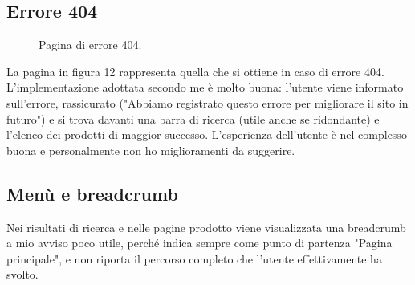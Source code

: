 \subsection{Errore 404}
\begin{figure}[!htb]
	\caption{\label{fig:figura12}} Pagina di errore 404.
\end{figure}
La pagina in figura 12 rappresenta quella che si ottiene in caso di errore 404. L'implementazione adottata secondo me è molto buona: l'utente viene informato sull'errore, rassicurato ("Abbiamo registrato questo errore per migliorare il sito in futuro") e si trova davanti una barra di ricerca (utile anche se ridondante) e l'elenco dei prodotti di maggior successo. L'esperienza dell'utente è nel complesso buona e personalmente non ho miglioramenti da suggerire.

\subsection{Menù e breadcrumb}
Nei risultati di ricerca e nelle pagine prodotto viene visualizzata una breadcrumb a mio avviso poco utile, perché indica sempre come punto di partenza "Pagina principale", e non riporta il percorso completo che l'utente effettivamente ha svolto.